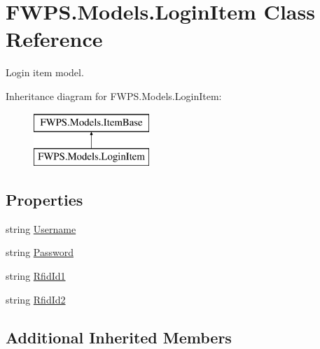 \hypertarget{class_f_w_p_s_1_1_models_1_1_login_item}{}\section{F\+W\+P\+S.\+Models.\+Login\+Item Class Reference}
\label{class_f_w_p_s_1_1_models_1_1_login_item}


Login item model.  


Inheritance diagram for F\+W\+P\+S.\+Models.\+Login\+Item\+:\begin{figure}[H]
\begin{center}
\leavevmode
\includegraphics[height=2.000000cm]{class_f_w_p_s_1_1_models_1_1_login_item}
\end{center}
\end{figure}
\subsection*{Properties}
\begin{DoxyCompactItemize}
\item 
string \mbox{\hyperlink{class_f_w_p_s_1_1_models_1_1_login_item_a9088bb99487c0aee78c9551f766fa1be}{Username}}
\item 
string \mbox{\hyperlink{class_f_w_p_s_1_1_models_1_1_login_item_a3d92ebed746774c2bb52bfbd18e66328}{Password}}
\item 
string \mbox{\hyperlink{class_f_w_p_s_1_1_models_1_1_login_item_a01e184940f30dfb2a56ea31ca0a0d054}{Rfid\+Id1}}
\item 
string \mbox{\hyperlink{class_f_w_p_s_1_1_models_1_1_login_item_a87e81cabed21bea54ee29fa061651623}{Rfid\+Id2}}
\end{DoxyCompactItemize}
\subsection*{Additional Inherited Members}


